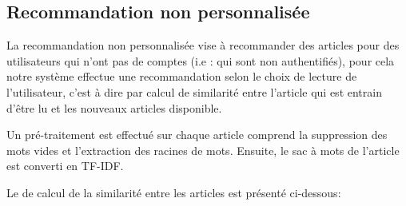     \subsection{Recommandation non personnalisée}
    La recommandation non personnalisée vise à recommander des articles pour des utilisateurs qui n'ont pas de comptes (i.e : qui sont non authentifiés), pour cela notre système effectue une recommandation selon le choix de lecture de l'utilisateur, c'est à dire par calcul de similarité entre l'article qui est entrain d'être lu et les nouveaux articles disponible. 

    Un pré-traitement est effectué sur chaque article comprend la suppression des mots vides et l'extraction des racines de mots. Ensuite, le sac à mots de l'article est converti en TF-IDF.  

    Le de calcul de la similarité entre les articles est présenté ci-dessous:

